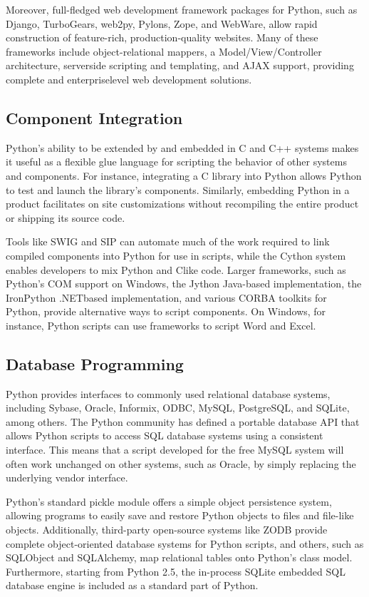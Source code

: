 \documentclass[12pt]{book}
\begin{document}
Moreover, full-fledged web development framework packages for Python, such as Django, TurboGears, web2py, Pylons, Zope, and WebWare, allow rapid construction of feature-rich, production-quality websites. Many of these frameworks include object-relational mappers, a Model\slash View\slash Controller architecture, server\dash side scripting and templating, and AJAX support, providing complete and enterprise\dash level web development solutions.

\subsection{Component Integration}

Python's ability to be extended by and embedded in C and C++ systems makes it useful as a flexible glue language for scripting the behavior of other systems and components. For instance, integrating a C library into Python allows Python to test and launch the library's components. Similarly, embedding Python in a product facilitates on \dash site customizations without recompiling the entire product or shipping its source code.

Tools like SWIG and SIP can automate much of the work required to link compiled components into Python for use in scripts, while the Cython system enables developers to mix Python and C\-like code. Larger frameworks, such as Python's COM support on Windows, the Jython Java-based implementation, the IronPython .NET\-based implementation, and various CORBA toolkits for Python, provide alternative ways to script components. On Windows, for instance, Python scripts can use frameworks to script Word and Excel.

\subsection{Database Programming}

Python provides interfaces to commonly used relational database systems, including Sybase, Oracle, Informix, ODBC, MySQL, PostgreSQL, and SQLite, among others. The Python community has defined a portable database API that allows Python scripts to access SQL database systems using a consistent interface. This means that a script developed for the free MySQL system will often work unchanged on other systems, such as Oracle, by simply replacing the underlying vendor interface.

Python's standard pickle module offers a simple object persistence system, allowing programs to easily save and restore Python objects to files and file-like objects. Additionally, third-party open-source systems like ZODB provide complete object-oriented database systems for Python scripts, and others, such as SQLObject and SQLAlchemy, map relational tables onto Python's class model. Furthermore, starting from Python 2.5, the in-process SQLite embedded SQL database engine is included as a standard part of Python.
\end{document}
